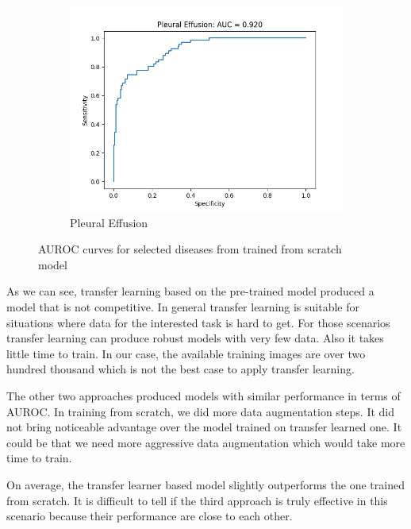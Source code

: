 \documentclass{amia}
\begin{document}
\begin{figure}[th]
\begin{subfigure}{0.19\linewidth}
	\includegraphics[width=\linewidth]{Pleural_Effusion_roc.png}
	\caption{Pleural Effusion}\label{ROC_Pleural_Effusion}
\end{subfigure}
\caption{AUROC curves for selected diseases from trained from scratch model}\label{auroc}
\end{figure}


As we can see, transfer learning based on the pre-trained model produced a model that is not competitive. In general transfer learning is suitable for situations where data for the interested task is hard to get. For those scenarios transfer learning can produce robust models with very few data. Also it takes little time to train. In our case, the available training images are over two hundred thousand which is not the best case to apply transfer learning.


The other two approaches produced models with similar performance in terms of AUROC. In training from scratch, we did more data augmentation steps. It did not bring noticeable advantage over the model trained on transfer learned one. It could be that we need more aggressive data augmentation which would take more time to train.

On average, the transfer learner based model slightly outperforms the one trained from scratch. It is difficult to tell if the third approach is truly effective in this scenario because their performance are close to each other.
\end{document}
